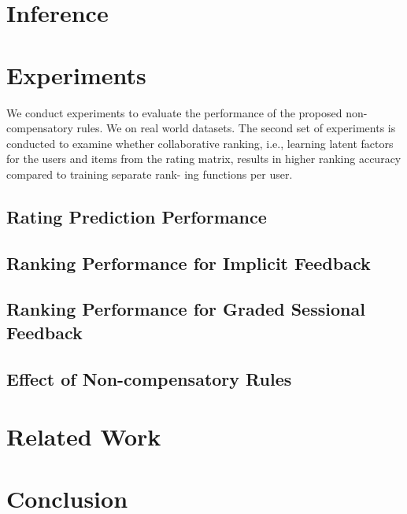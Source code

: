 \documentclass[letterpaper]{article} %
\begin{document}
\section{Inference}



\section{Experiments}\label{sec:experiment}
We conduct experiments to evaluate the performance of the proposed non-compensatory rules. We  on real world datasets. 
The second set of experiments is conducted to examine whether collaborative ranking, i.e., learning latent factors for the users and items from the rating matrix, results in higher ranking accuracy compared to training separate rank- ing functions per user.

\subsection{Rating Prediction Performance}

\subsection{Ranking Performance for Implicit Feedback}

\subsection{Ranking Performance for Graded Sessional Feedback}

\subsection{Effect of Non-compensatory Rules}

\section{Related Work}\label{sec:relatedwork}

\section{Conclusion}\label{sec:conclusion}




\end{document}

